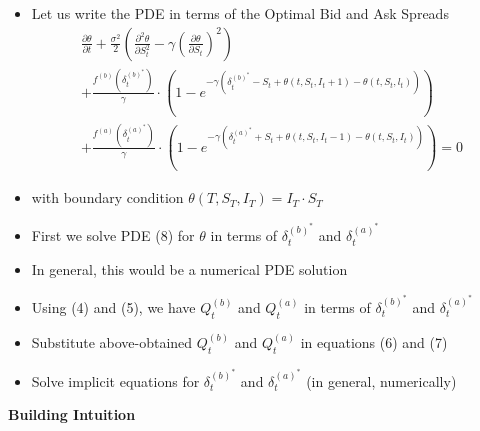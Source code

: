 \documentclass[10pt]{article}
\begin{document}
\begin{itemize} 
    \item Let us write the PDE in terms of the Optimal Bid and Ask Spreads
    \[
    \begin{array}{l}
    \frac{\partial \theta}{\partial t}+\frac{\sigma^{2}}{2}\left(\frac{\partial^{2} \theta}{\partial S_{t}^{2}}-\gamma\left(\frac{\partial \theta}{\partial S_{t}}\right)^{2}\right) \\
    +\frac{f^{(b)}\left(\delta_{t}^{(b)^{*}}\right)}{\gamma} \cdot\left(1-e^{-\gamma\left(\delta_{t}^{(b)^{*}}-S_{t}+\theta\left(t, S_{t}, I_{t}+1\right)-\theta\left(t, S_{t}, l_{t}\right)\right)}\right) \\
    +\frac{f^{(a)}\left(\delta_{t}^{(a)^{*}}\right)}{\gamma} \cdot\left(1-e^{-\gamma\left(\delta_{t}^{(a)^{*}}+S_{t}+\theta\left(t, S_{t}, I_{t}-1\right)-\theta\left(t, S_{t}, I_{t}\right)\right)}\right)=0
    \end{array} \tag{8}
    \]
    \item with boundary condition $\theta\left(T, S_{T}, I_{T}\right)=I_{T} \cdot S_{T}$
    \item First we solve PDE (8) for $\theta$ in terms of $\delta_{t}^{(b)^{*}}$ and $\delta_{t}^{(a)^{*}}$
    \item In general, this would be a numerical PDE solution
    \item Using (4) and (5), we have $Q_{t}^{(b)}$ and $Q_{t}^{(a)}$ in terms of $\delta_{t}^{(b)^{*}}$ and $\delta_{t}^{(a)^{*}}$
    \item Substitute above-obtained $Q_{t}^{(b)}$ and $Q_{t}^{(a)}$ in equations (6) and (7)
    \item Solve implicit equations for $\delta_{t}^{(b)^{*}}$ and $\delta_{t}^{(a)^{*}}$ (in general, numerically)
\end{itemize}

\textbf{Building Intuition}
\end{document}
